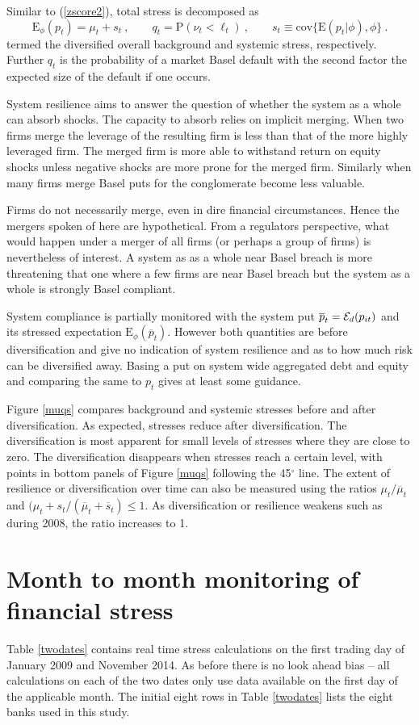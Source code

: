 \documentclass[12pt]{article}
\newcommand{\E}{\mathrm{E}}
\newcommand{\cov}{\mathrm{cov}}
\newcommand{\Ex}{{\cal E}}
\newcommand{\Exd}{\Ex_d}
\newcommand{\Es}{\E_\phi}
\newcommand{\eref}[1]{(\ref{#1})}
\newcommand{\fref}[1]{Figure \ref{#1}}
\newcommand{\tref}[1]{Table \ref{#1}}
\newcommand{\cq}{\ , \qquad}
\renewcommand{\P}{\mathrm{P}}
\newcommand{\be}[1]{\begin{equation}\label{#1}}
\newcommand{\ee}{\end{equation}}
\begin{document}
Similar  to \eref{zscore2}, total  stress is decomposed as
\be{overall}
\Es(p_t) = \mu_t  + s_t\cq q_{t}=\P(\nu_t<\ell_t) \cq  s_t \equiv \cov\{\E(p_t|\phi),\phi\}\ .
\ee
termed the diversified overall background  and systemic stress, respectively.   Further $q_t$ is the probability of  a market Basel default with the second factor the expected size of the default if one occurs.

System resilience aims to answer the question of whether the system as a whole can absorb shocks.   The capacity to absorb relies on implicit merging.  When two firms merge the leverage of the resulting firm is less than that of the more highly leveraged firm.   The merged firm is more able to withstand return on equity shocks  unless negative shocks are more prone for the merged firm.   Similarly when many firms merge Basel puts for the conglomerate become less valuable.

Firms do not necessarily merge, even in dire financial circumstances.   Hence the mergers spoken of here are hypothetical.   From a regulators perspective, what would happen under a merger of all firms (or perhaps a group of firms) is nevertheless of interest.   A system as as a whole near Basel breach is more threatening that one where a few firms are near Basel breach but the system as a whole is strongly Basel compliant.

System compliance is partially monitored with the system put $\overline p_t=\Exd(p_{it})$ and its stressed expectation $\Es(\overline p_t)$. However both quantities are before diversification and give no indication of system resilience and as to how much risk can be diversified away. Basing a put on system wide aggregated debt and equity and comparing the same to $p_t$  gives at least some guidance.

\fref{muqs} compares background and systemic stresses before and after diversification. As expected, stresses reduce after diversification. The diversification is most apparent for small levels of stresses where they are close to zero. The diversification disappears when stresses reach a certain level, with points in bottom panels of \fref{muqs} following the 45$^\circ$ line. The extent of resilience or diversification over time can also be measured using the ratios $\mu_t/\overline \mu_t$ and $(\mu_t+s_t/(\overline \mu_t+\overline s_t)\le 1$. As diversification or resilience weakens such as during 2008, the ratio increases to 1.

\section{Month to month monitoring  of financial stress}\label{monitoring}
 \tref{twodates} contains real time stress calculations on the first trading day of  January 2009 and November 2014.  As before there is no look ahead bias -- all calculations on each of the two dates only use data available on the first day of the applicable month.   The initial eight rows in \tref{twodates} lists the eight banks used in this study. 
\end{document}
